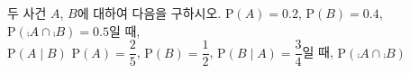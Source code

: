 두 사건 $A$, $B$에 대하여 다음을 구하시오.
 $\mathrm{P}(A)=0.2$, $\mathrm{P}(B)=0.4$, $\mathrm{P}(\comp{A}\cap\comp{B})=0.5$일 때,\\ $\mathrm{P}(A\mid B)$
 $\mathrm{P}(A)=\dfrac{2}{5}$, $\mathrm{P}(B)=\dfrac{1}{2}$, $\mathrm{P}(B\mid A)=\dfrac{3}{4}$일 때, $\mathrm{P}(\comp{A}\cap\comp{B})$
